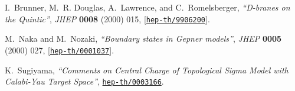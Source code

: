\documentclass[a4paper,12pt]{article}
\numberwithin{equation}{section}
\begin{document}
\begin{thebibliography}{10}
I.~Brunner, M.~R. Douglas, A.~Lawrence, and C.~Romelsberger, {\it ``{D-branes
  on the Quintic}''},  {\em JHEP} {\bf 0008} (2000) 015,
  [\href{http://xxx.lanl.gov/abs/hep-th/9906200}{{\tt hep-th/9906200}}].

M.~Naka and M.~Nozaki, {\it ``{Boundary states in Gepner models}''},  {\em
  JHEP} {\bf 0005} (2000) 027,
  [\href{http://xxx.lanl.gov/abs/hep-th/0001037}{{\tt hep-th/0001037}}].

K.~Sugiyama, {\it ``{Comments on Central Charge of Topological Sigma Model with
  Calabi-Yau Target Space}''},
  \href{http://xxx.lanl.gov/abs/hep-th/0003166}{{\tt hep-th/0003166}}.

\end{thebibliography}\endgroup
\end{document}
